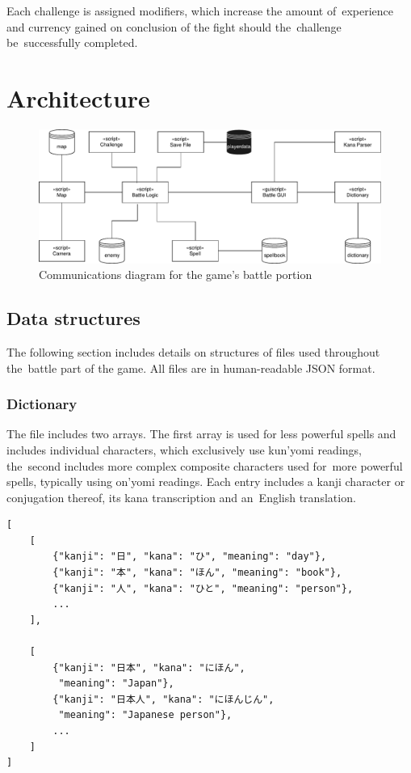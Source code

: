 \documentclass[thesis=B,english,hidelinks]{FITthesisXE}[2012/06/26]
\begin{document}
Each challenge is assigned modifiers, which increase the amount of~experience and currency gained on conclusion of the fight should the~challenge be~successfully completed.

\section{Architecture}

\begin{figure}[ht]
\centering
\includegraphics[scale=0.57]{diagram_battle}
\caption{Communications diagram for the game's battle portion}
\label{fig:diagram_battle}
\end{figure}

\subsection{Data structures}

The following section includes details on structures of files used throughout the~battle part of the game. All files are in human-readable JSON format.

\subsubsection{Dictionary}

The file includes two arrays. The first array is used for less powerful spells and includes individual characters, which exclusively use kun'yomi readings, the~second includes more complex composite characters used for~more powerful spells, typically using on'yomi readings. Each entry includes a kanji character or conjugation thereof, its kana transcription and an~English translation.

\begin{lstlisting}
[
    [
        {"kanji": "日", "kana": "ひ", "meaning": "day"},
        {"kanji": "本", "kana": "ほん", "meaning": "book"},
        {"kanji": "人", "kana": "ひと", "meaning": "person"},
        ...
    ],

    [
        {"kanji": "日本", "kana": "にほん", 
         "meaning": "Japan"},
        {"kanji": "日本人", "kana": "にほんじん", 
         "meaning": "Japanese person"},
        ...
    ]
]
\end{lstlisting}
\end{document}
